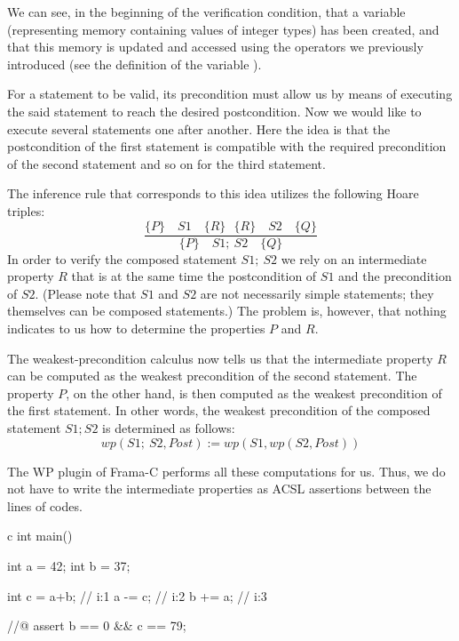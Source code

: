 

We can see, in the beginning of the verification condition, that a variable
 (representing memory containing values of integer types) has been
created, and that this memory is updated and accessed using the operators we
previously introduced (see the definition of the variable ).



For a statement to be valid, its precondition must allow us by means of
executing the said statement to reach the desired postcondition. Now we
would like to execute several statements one after another. Here the
idea is that the postcondition of the first statement is compatible with
the required precondition of the second statement and so on for the
third statement.



The inference rule that corresponds to this idea utilizes the following
Hoare triples:
$$\dfrac{\{P\}\quad S1 \quad \{R\} \ \ \ \{R\}\quad S2 \quad \{Q\}}{\{P\}\quad S1 ;\ S2 \quad \{Q\}}$$
In order to verify the composed statement $S1;\ S2$ we rely on an
intermediate property $R$ that is at the same time the postcondition
of $S1$ and the precondition of $S2$. (Please note that $S1$ and
$S2$ are not necessarily simple statements; they themselves can be
composed statements.) The problem is, however, that nothing indicates to us
how to determine the properties $P$ and $R$.

The weakest-precondition calculus now tells us that the intermediate
property $R$ can be computed as the weakest precondition of the second
statement. The property $P$, on the other hand, is then computed as
the weakest precondition of the first statement. In other words, the
weakest precondition of the composed statement $S1; S2$ is determined
as follows:
$$wp(S1;\ S2 , Post) := wp(S1, wp(S2, Post) )$$


The WP plugin of Frama-C performs all these computations for us. Thus,
we do not have to write the intermediate properties as ACSL assertions
between the lines of codes.



\begin{CodeBlock}{c}
int main(){
  int a = 42;
  int b = 37;

  int c = a+b; // i:1
  a -= c;      // i:2
  b += a;      // i:3

  //@ assert b == 0 && c == 79;
}
\end{CodeBlock}



